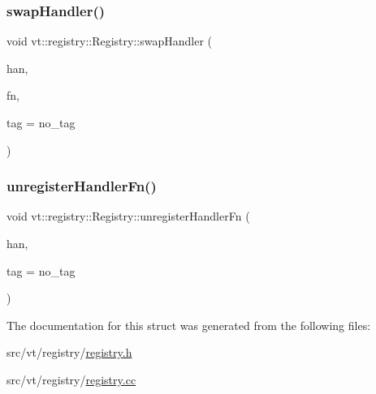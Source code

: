 \mbox{\label{structvt_1_1registry_1_1_registry_affe7c413b570120f7ccb0af95d6e9181}} 
\subsubsection{\texorpdfstring{swap\+Handler()}{swapHandler()}}
{\footnotesize\ttfamily void vt\+::registry\+::\+Registry\+::swap\+Handler (\begin{DoxyParamCaption}\item[{\hyperlink{namespacevt_af64846b57dfcaf104da3ef6967917573}{Handler\+Type} const \&}]{han,  }\item[{\hyperlink{namespacevt_a2a06c34cafcd511828f16cbf1476b924}{Active\+Closure\+Fn\+Type}}]{fn,  }\item[{\hyperlink{namespacevt_a84ab281dae04a52a4b243d6bf62d0e52}{Tag\+Type} const \&}]{tag = {\ttfamily no\+\_\+tag} }\end{DoxyParamCaption})}

\mbox{\label{structvt_1_1registry_1_1_registry_adaee9715edeb66b2fc8cd4639288a1cd}} 
\subsubsection{\texorpdfstring{unregister\+Handler\+Fn()}{unregisterHandlerFn()}}
{\footnotesize\ttfamily void vt\+::registry\+::\+Registry\+::unregister\+Handler\+Fn (\begin{DoxyParamCaption}\item[{\hyperlink{namespacevt_af64846b57dfcaf104da3ef6967917573}{Handler\+Type} const \&}]{han,  }\item[{\hyperlink{namespacevt_a84ab281dae04a52a4b243d6bf62d0e52}{Tag\+Type} const \&}]{tag = {\ttfamily no\+\_\+tag} }\end{DoxyParamCaption})}



The documentation for this struct was generated from the following files\+:\begin{DoxyCompactItemize}
\item 
src/vt/registry/\hyperlink{registry_2registry_8h}{registry.\+h}\item 
src/vt/registry/\hyperlink{registry_8cc}{registry.\+cc}\end{DoxyCompactItemize}

